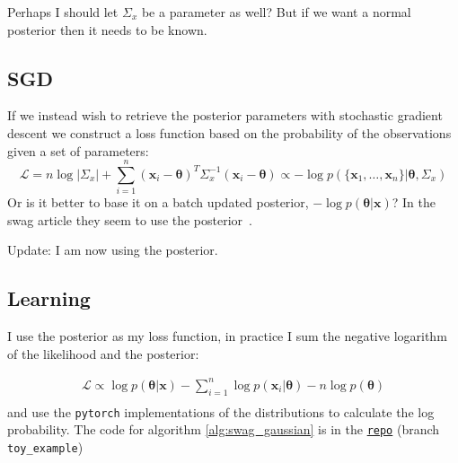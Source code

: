 Perhaps I should let $\Sigma_x$ be a parameter as well? But if we want a normal posterior then it needs to be known.



\subsection{SGD}

If we instead wish to retrieve the posterior parameters with stochastic gradient descent we construct a loss function based on the probability of the observations given a set of parameters:
\begin{equation}
  \mathcal{L} = n \log |\Sigma_x| + \displaystyle{\sum_{i=1}^n} (\bm{x}_i - \bm{\theta})^T \Sigma_x^{-1} (\bm{x}_i - \bm{\theta}) \propto - \log p(\{\bm{x}_1, \dots, \bm{x}_n\}| \bm{\theta}, \Sigma_x)
\end{equation}
Or is it better to base it on a batch updated posterior, $-\log p(\bm{\theta}| \bm{x})$? In the swag article they seem to use the posterior~\cite{swag}.

Update: I am now using the posterior.

\subsection{Learning}

I use the posterior as my loss function, in practice I sum the negative logarithm of the likelihood and the posterior:

\begin{align}
  \mathcal{L} \propto \log p( \bm{\theta} | \bm{x} )- \displaystyle{\sum_{i=1}^n} \log p( \bm{x}_i | \bm{\theta} ) - n \log p( \bm{\theta} ) \nonumber \\ 
\end{align}
and use the \texttt{pytorch} implementations of the distributions to calculate the log probability. The code for algorithm \ref{alg:swag_gaussian} is in the
\href{https://github.com/probabilisticdeeplearning/swa_gaussian/tree/toy_example}{\texttt{repo}} (branch \texttt{toy\_example})

